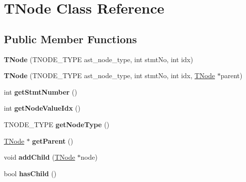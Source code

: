 \hypertarget{class_t_node}{}\section{T\+Node Class Reference}
\label{class_t_node}
\subsection*{Public Member Functions}
\begin{DoxyCompactItemize}
\item 
\hypertarget{class_t_node_aa6ceb57881cc4084537767ea7b30e637}{}{\bfseries T\+Node} (T\+N\+O\+D\+E\+\_\+\+T\+Y\+P\+E ast\+\_\+node\+\_\+type, int stmt\+No, int idx)\label{class_t_node_aa6ceb57881cc4084537767ea7b30e637}

\item 
\hypertarget{class_t_node_a83885f1f1bc2a12b7fbaff415431d43a}{}{\bfseries T\+Node} (T\+N\+O\+D\+E\+\_\+\+T\+Y\+P\+E ast\+\_\+node\+\_\+type, int stmt\+No, int idx, \hyperlink{class_t_node}{T\+Node} $\ast$parent)\label{class_t_node_a83885f1f1bc2a12b7fbaff415431d43a}

\item 
\hypertarget{class_t_node_afd64a23b8f8f91691f77fdc6f0a7ed94}{}int {\bfseries get\+Stmt\+Number} ()\label{class_t_node_afd64a23b8f8f91691f77fdc6f0a7ed94}

\item 
\hypertarget{class_t_node_a60c27fb84a36bb419565ef1660305941}{}int {\bfseries get\+Node\+Value\+Idx} ()\label{class_t_node_a60c27fb84a36bb419565ef1660305941}

\item 
\hypertarget{class_t_node_a1bb40d24f59ec0148bdcc71a73edbd94}{}T\+N\+O\+D\+E\+\_\+\+T\+Y\+P\+E {\bfseries get\+Node\+Type} ()\label{class_t_node_a1bb40d24f59ec0148bdcc71a73edbd94}

\item 
\hypertarget{class_t_node_ae4fd972615adb2bf377d8e134fcad134}{}\hyperlink{class_t_node}{T\+Node} $\ast$ {\bfseries get\+Parent} ()\label{class_t_node_ae4fd972615adb2bf377d8e134fcad134}

\item 
\hypertarget{class_t_node_a1e12ffdc059b0a492072e04e2768b234}{}void {\bfseries add\+Child} (\hyperlink{class_t_node}{T\+Node} $\ast$node)\label{class_t_node_a1e12ffdc059b0a492072e04e2768b234}

\item 
\hypertarget{class_t_node_a0a04078910a2de8eef5191f0693545b6}{}bool {\bfseries has\+Child} ()\label{class_t_node_a0a04078910a2de8eef5191f0693545b6}


\end{DoxyCompactItemize}
